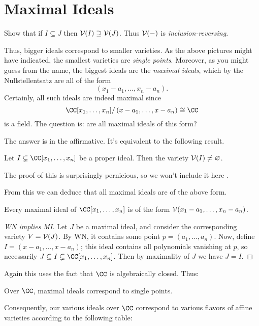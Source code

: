 \section{Maximal Ideals}
\begin{ques}
	Show that if $I \subseteq J$ then $\mathcal V(I) \supseteq \mathcal V(J)$.
	Thus $\mathcal V(-)$ is \emph{inclusion-reversing}.
\end{ques}
Thus, bigger ideals correspond to smaller varieties.
As the above pictures might have indicated, the smallest varieties are \emph{single points}.
Moreover, as you might guess from the name, the biggest ideals are the \emph{maximal ideals},
which by the Nullstellentsatz are all of the form
\[ \left( x_1-a_1, \dots, x_n-a_n \right). \]
Certainly, all such ideals are indeed maximal since
\[ \CC[x_1, \dots, x_n] / \left( x-a_1, \dots, x-a_n \right) \cong \CC \]
is a field.
The question is: are all maximal ideals of this form?

The answer is in the affirmative. It's equivalent to the following result.
\begin{theorem}
	Let $I \subsetneq \CC[x_1, \dots, x_n]$ be a proper ideal.
	Then the variety $\mathcal V(I) \neq \varnothing$.
\end{theorem}
The proof of this is surprisingly pernicious, so
we won't include it here .

From this we can deduce that all maximal ideals are of the above form.
\begin{theorem}
	Every maximal ideal of $\CC[x_1, \dots, x_n]$
	is of the form $\mathcal V(x_1-a_1, \dots, x_n-a_n)$.
\end{theorem}
\begin{proof}
	[WN implies MI]
	Let $J$ be a maximal ideal, and consider the corresponding variety $V = \mathcal V(J)$.
	By WN, it contains some point $p=(a_1, \dots, a_n)$.
	Now, define $I = (x-a_1, \dots, x-a_n)$; this ideal contains all polynomials
	vanishing at $p$, so necessarily $J \subseteq I \subsetneq \CC[x_1, \dots, x_n]$.
	Then by maximality of $J$ we have $J=I$.
\end{proof}
Again this uses the fact that $\CC$ is algebraically closed. Thus:
\begin{moral}
	Over $\CC$, maximal ideals correspond to single points.
\end{moral}

Consequently, our various ideals over $\CC$ correspond to various flavors
of affine varieties according to the following table:

